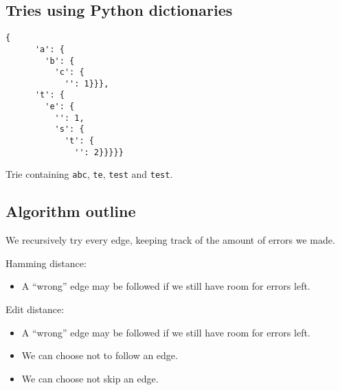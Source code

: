 \documentclass[slidestop]{beamer}
\begin{document}
\subsection{Tries using Python dictionaries}
\begin{pframe}
  \begin{lstlisting}[language=none, caption={Using Python disctionaries.}]
    {
      'a': {
        'b': {
          'c': {
            '': 1}}},
      't': {
        'e': {
          '': 1,
          's': {
            't': {
              '': 2}}}}}
  \end{lstlisting}

  Trie containing \texttt{abc}, \texttt{te}, \texttt{test} and \texttt{test}.

\end{pframe}

\subsection{Algorithm outline}
\begin{pframe}
  We recursively try every edge, keeping track of the amount of errors we made.
  \bigskip

  Hamming distance:
  \begin{itemize}
    \item A ``wrong'' edge may be followed if we still have room for errors
      left.
  \end{itemize}
  \bigskip

  Edit distance:
  \begin{itemize}
    \item A ``wrong'' edge may be followed if we still have room for errors
      left.
    \item We can choose not to follow an edge.
    \item We can choose not skip an edge.
  \end{itemize}
\end{pframe}
\end{document}
